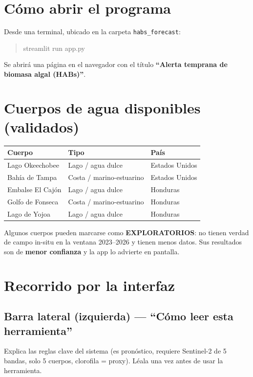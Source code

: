 \documentclass[11pt]{article}
\begin{document}
\section{C\'omo abrir el programa}
Desde una terminal, ubicado en la carpeta \texttt{habs\_forecast}:
\begin{quote}\ttfamily streamlit run app.py\end{quote}
Se abrir\'a una p\'agina en el navegador con el t\'itulo
\textbf{``Alerta temprana de biomasa algal (HABs)''}.

\section{Cuerpos de agua disponibles (validados)}
\begin{tabularx}{\textwidth}{L L L}
\toprule
\textbf{Cuerpo} & \textbf{Tipo} & \textbf{Pa\'is} \\
\midrule
Lago Okeechobee   & Lago / agua dulce        & Estados Unidos \\
Bah\'ia de Tampa   & Costa / marino-estuarino & Estados Unidos \\
Embalse El Caj\'on & Lago / agua dulce        & Honduras \\
Golfo de Fonseca  & Costa / marino-estuarino & Honduras \\
Lago de Yojoa     & Lago / agua dulce        & Honduras \\
\bottomrule
\end{tabularx}

\begin{nota}
Algunos cuerpos pueden marcarse como \textbf{EXPLORATORIOS}: no tienen verdad de campo
in-situ en la ventana 2023--2026 y tienen menos datos. Sus resultados son de
\textbf{menor confianza} y la app lo advierte en pantalla.
\end{nota}

\section{Recorrido por la interfaz}

\subsection{Barra lateral (izquierda) --- ``C\'omo leer esta herramienta''}
Explica las reglas clave del sistema (es pron\'ostico, requiere Sentinel-2 de 5 bandas,
solo 5 cuerpos, clorofila = proxy). L\'eala una vez antes de usar la herramienta.
\end{document}
